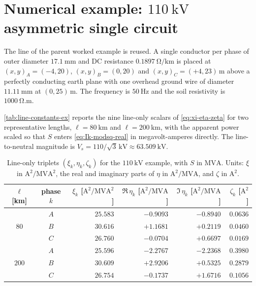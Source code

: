 
\section{\texorpdfstring{Numerical example: $\SI{110}{\kilo\volt}$ asymmetric single circuit}{Numerical example: 110 kV asymmetric single circuit}}
\label{sec:example}

The line of the parent worked example is reused. A single conductor per
phase of outer diameter $\SI{17.1}{\milli\metre}$ and DC resistance
$\SI{0.1897}{\ohm/\kilo\metre}$ is placed at
$(x,y)_{A}=(-4,20)$, $(x,y)_{B}=(0,20)$ and
$(x,y)_{C}=(+4,23)\,\si{\metre}$ above a perfectly conducting earth
plane with one overhead ground wire of diameter
$\SI{11.11}{\milli\metre}$ at $(0,25)\,\si{\metre}$. The frequency is
$\SI{50}{\hertz}$ and the soil resistivity is
$\SI{1000}{\ohm.\metre}$.

\autoref{tab:line-constants-ex} reports the nine line-only scalars of
\autoref{eq:xi-eta-zeta} for two representative lengths,
$\ell=\SI{80}{\kilo\metre}$ and $\ell=\SI{200}{\kilo\metre}$, with the
apparent power scaled so that $S$ enters \autoref{eq:Ik-modsq-real} in
megavolt-amperes directly. The line-to-neutral magnitude is
$V_{s}=110/\sqrt{3}\,\si{\kilo\volt}\approx\SI{63.509}{\kilo\volt}$.

\begin{table}[h]
\centering
\renewcommand{\arraystretch}{1.18}
\begin{tabular}{c c r r r r}
\toprule
$\ell$ [km] & phase $k$ &
$\xi_{k}$ [$\si{\ampere\squared/\mega\volt\ampere\squared}$] &
$\Re\,\eta_{k}$ [$\si{\ampere\squared/\mega\volt\ampere}$] &
$\Im\,\eta_{k}$ [$\si{\ampere\squared/\mega\volt\ampere}$] &
$\zeta_{k}$ [$\si{\ampere\squared}$] \\
\midrule
\multirow{3}{*}{$80$}
  & $A$ & $25.583$ & $-0.9093$ & $-0.8940$ & $0.0636$ \\
  & $B$ & $30.616$ & $+1.1681$ & $+0.2119$ & $0.0460$ \\
  & $C$ & $26.760$ & $-0.0704$ & $+0.6697$ & $0.0169$ \\
\midrule
\multirow{3}{*}{$200$}
  & $A$ & $25.596$ & $-2.2767$ & $-2.2368$ & $0.3980$ \\
  & $B$ & $30.609$ & $+2.9206$ & $+0.5325$ & $0.2879$ \\
  & $C$ & $26.754$ & $-0.1737$ & $+1.6716$ & $0.1056$ \\
\bottomrule
\end{tabular}
\caption{Line-only triplets $(\xi_{k},\eta_{k},\zeta_{k})$ for the
$\SI{110}{\kilo\volt}$ example, with $S$ in $\si{\mega\volt\ampere}$.
Units: $\xi$ in $\si{\ampere\squared/\mega\volt\ampere\squared}$,
the real and imaginary parts of $\eta$ in
$\si{\ampere\squared/\mega\volt\ampere}$,
and $\zeta$ in $\si{\ampere\squared}$.}
\label{tab:line-constants-ex}
\end{table}

